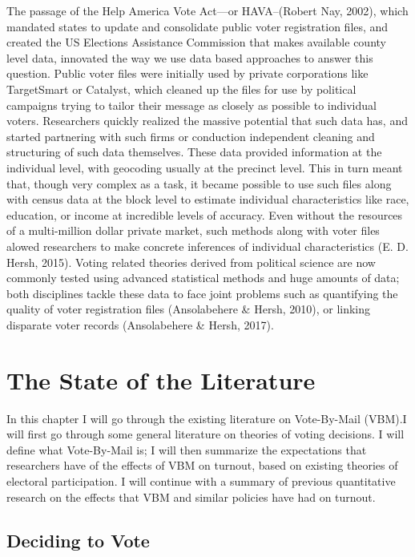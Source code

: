 \documentclass[12pt,twoside]{reedthesis}
\begin{document}
  The passage of the Help America Vote Act---or HAVA--(Robert Nay, 2002),
  which mandated states to update and consolidate public voter
  registration files, and created the US Elections Assistance Commission
  that makes available county level data, innovated the way we use data
  based approaches to answer this question. Public voter files were
  initially used by private corporations like TargetSmart or Catalyst,
  which cleaned up the files for use by political campaigns trying to
  tailor their message as closely as possible to individual voters.
  Researchers quickly realized the massive potential that such data has,
  and started partnering with such firms or conduction independent
  cleaning and structuring of such data themselves. These data provided
  information at the individual level, with geocoding usually at the
  precinct level. This in turn meant that, though very complex as a task,
  it became possible to use such files along with census data at the block
  level to estimate individual characteristics like race, education, or
  income at incredible levels of accuracy. Even without the resources of a
  multi-million dollar private market, such methods along with voter files
  alowed researchers to make concrete inferences of individual
  characteristics (E. D. Hersh, 2015). Voting related theories derived
  from political science are now commonly tested using advanced
  statistical methods and huge amounts of data; both disciplines tackle
  these data to face joint problems such as quantifying the quality of
  voter registration files (Ansolabehere \& Hersh, 2010), or linking
  disparate voter records (Ansolabehere \& Hersh, 2017).
  
  \chapter{The State of the Literature}\label{rmd-basics}
  
  In this chapter I will go through the existing literature on
  Vote-By-Mail (VBM).I will first go through some general literature on
  theories of voting decisions. I will define what Vote-By-Mail is; I will
  then summarize the expectations that researchers have of the effects of
  VBM on turnout, based on existing theories of electoral participation. I
  will continue with a summary of previous quantitative research on the
  effects that VBM and similar policies have had on turnout.
  
  \section{Deciding to Vote}\label{deciding-to-vote}
  
\end{document}
